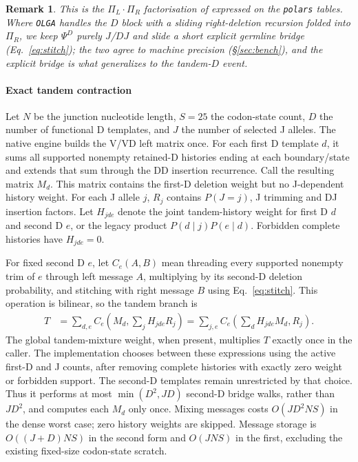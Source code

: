 \documentclass[11pt]{article}
\theoremstyle{oldplain}
\theoremstyle{oldrem}
\newtheorem{remark}{Remark}
\begin{document}
\begin{remark}
This is the $\Pi_L\!\cdot\!\Pi_R$ factorisation of \cite{Sethna2019} expressed on the
\texttt{polars} tables. Where \texttt{OLGA} handles the $D$ block with a sliding right-deletion recursion
folded into $\Pi_R$, we keep $\Psi^D$ purely $J$/$DJ$ and slide a short explicit germline bridge
(Eq.~\eqref{eq:stitch}); the two agree to machine precision (\S\ref{sec:bench}), and the explicit bridge
is what generalizes to the tandem-$D$ event.
\end{remark}

\paragraph{Exact tandem contraction}
Let $N$ be the junction nucleotide length, $S=25$ the codon-state count,
$D$ the number of functional D templates, and $J$ the number of selected J
alleles. The native engine builds the V/VD left matrix once.
For each first D template $d$, it sums all supported nonempty retained-D
histories ending at each boundary/state and extends that sum through the DD
insertion recurrence. Call the resulting matrix $M_d$.
This matrix contains the first-D deletion weight but no J-dependent history
weight. For each J allele $j$, $R_j$ contains $P(J=j)$, J trimming and DJ
insertion factors. Let $H_{jde}$ denote the joint tandem-history weight for
first D $d$ and second D $e$, or the legacy product
$P(d\mid j)P(e\mid d)$. Forbidden complete histories have $H_{jde}=0$.

For fixed second D $e$, let $C_e(A,B)$ mean threading every supported nonempty
trim of $e$ through left message $A$, multiplying by its second-D deletion
probability, and stitching with right message $B$ using
Eq.~\eqref{eq:stitch}. This operation is bilinear, so the tandem branch is
\begin{align}
 T &= \sum_{d,e} C_e\!\left(M_d,\sum_j H_{jde}R_j\right)
    = \sum_{j,e} C_e\!\left(\sum_d H_{jde}M_d,R_j\right).
\end{align}
The global tandem-mixture weight, when present, multiplies $T$ exactly once
in the caller. The implementation chooses between these expressions using the active first-D
and J counts, after removing complete histories with exactly zero weight or
forbidden support. The second-D templates remain unrestricted by that choice. Thus it performs at most
$\min(D^2,JD)$ second-D bridge walks, rather than $JD^2$, and computes each
$M_d$ only once. Mixing messages costs $O(JD^2NS)$ in the dense worst case;
zero history weights are skipped. Message storage is $O((J+D)NS)$ in the
second form and $O(JNS)$ in the first, excluding the existing fixed-size
codon-state scratch.
\end{document}
